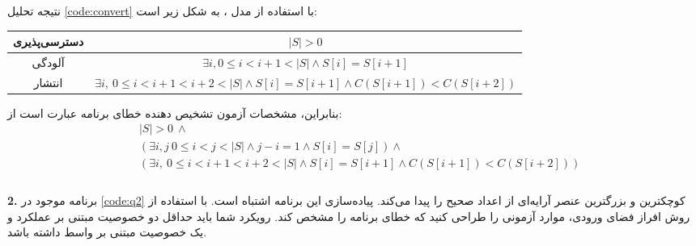 \documentclass{article}
\newenvironment{answer}{}{\\[.3ex]}
\newenvironment{question}[1]{\textbf{#1.} }{}
\begin{document}
\begin{answer}
نتیجه تحلیل \autoref{code:convert} با استفاده از مدل ، به شکل زیر است:

\begin{table}[h]
	\centering
\begin{tabular}{c|c}
	دسترسی‌پذیری & $|S| > 0$\\\hline
	آلودگی & $\exists i, 0 \leq i < i + 1 < |S| \wedge S[i]=S[i+1]$\\\hline
	انتشار &
	$\exists i,\ 0 \leq i < i + 1 < i + 2 < |S| \wedge S[i]=S[i+1] \wedge C(S[i+1]) < C(S[i+2])$
\end{tabular}
\end{table}
بنابراین، مشخصات آزمون تشخیص دهنده خطای برنامه عبارت است از:
\begin{align*}
	&|S| > 0\ \wedge\\
	&\left(\exists i, j\ 0 \leq i < j < |S| \wedge j - i = 1 \wedge S[i]=S[j]\right) \wedge\\
	& \left(\exists i,\ 0 \leq i < i + 1 < i + 2 < |S| \wedge S[i]=S[i+1] \wedge C(S[i+1]) < C(S[i+2])\right)\\
\end{align*}
\end{answer}
\begin{question}{2}
برنامه موجود در \autoref{code:q2} کوچکترین و بزرگترین عنصر آرایه‌ای از اعداد صحیح را پیدا می‌کند. پیاده‌سازی این برنامه اشتباه است. با استفاده از روش افراز فضای ورودی، موارد آزمونی را طراحی کنید که خطای برنامه را مشخص کند. رویکرد شما باید حداقل دو خصوصیت مبتنی بر عملکرد و یک خصوصیت مبتنی بر واسط داشته باشد.
\end{question}
\end{document}
